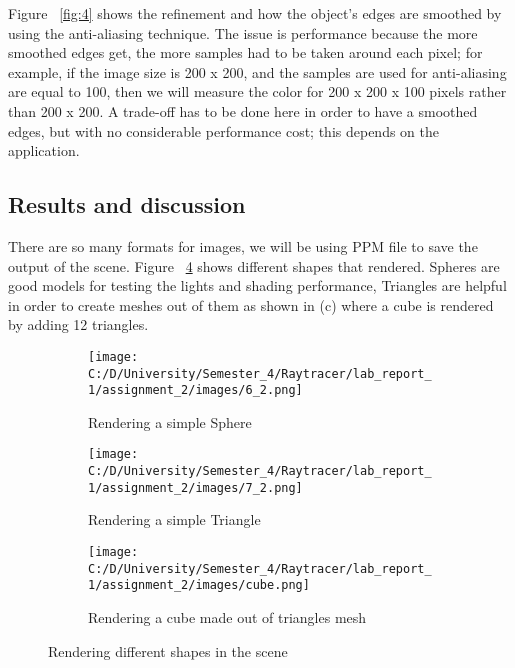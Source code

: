 \documentclass{article}
\begin{document}
	
	Figure ~\ref{fig:4} shows the refinement and how the object's edges are smoothed by using the anti-aliasing technique. The issue is performance because the more smoothed edges get, the more samples had to be taken around each pixel; for example, if the image size is 200 x 200, and the samples are used for anti-aliasing are equal to 100, then we will measure the color for 200 x 200 x 100 pixels rather than 200 x 200. 
	A trade-off has to be done here in order to have a smoothed edges, but with no considerable performance cost; this depends on the application. 
	
	
	
	
	\subsection{Results and discussion}
	
	There are so many formats for images, we will be using PPM file to save the output of the scene. Figure ~\ref{fig:5} shows different shapes that rendered. Spheres are good models for testing the lights and shading performance, Triangles are helpful in order to create meshes out of them as shown in (c) where a cube is rendered by adding 12 triangles. 
	\begin{figure}[ht]
		\begin{center}
			\begin{subfigure}{.3\textwidth}
				\centering
				\texttt{[image: C:/D/University/Semester\_4/Raytracer/lab\_report\_1/assignment\_2/images/6\_2.png]}  
				\caption{Rendering a simple Sphere}
				\label{fig:sub-first}
			\end{subfigure}
			\begin{subfigure}{.3\textwidth}
				\centering
				\texttt{[image: C:/D/University/Semester\_4/Raytracer/lab\_report\_1/assignment\_2/images/7\_2.png]}  
				\caption{Rendering a simple Triangle}
				\label{fig:sub-second}
			\end{subfigure}
			\begin{subfigure}{.3\textwidth}
				\centering
				\texttt{[image: C:/D/University/Semester\_4/Raytracer/lab\_report\_1/assignment\_2/images/cube.png]}  
				\caption{Rendering a cube made out of triangles mesh}
				\label{fig:sub-third}
			\end{subfigure}
			
			\caption{Rendering different shapes in the scene}
			\label{fig:5}
			
		\end{center}
	\end{figure}
	
\end{document}
